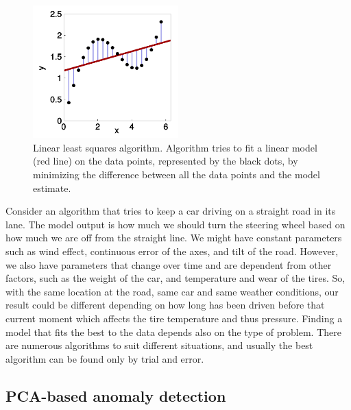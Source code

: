 \begin{figure}[htb]
    \centering
    \includegraphics[width=0.5\textwidth]{./appendices/linear-regression}
    \caption{Linear least squares algorithm.
    Algorithm tries to fit a linear model (red line) on the data points,
        represented by the black dots,
        by minimizing the difference between all the data points
        and the model estimate.~\cite{stulp2015many}
        \label{fig:linear-regression-example}}
\end{figure}

Consider an algorithm that tries to keep a car
driving on a straight road in its lane.
The model output is how much we should turn the steering wheel
based on how much we are off from the straight line.
We might have constant parameters such as
wind effect, continuous error of the axes, and tilt of the road.
However,
we also have parameters that change over time
and are dependent from other factors,
such as the weight of the car,
and temperature and wear of the tires.
So, with the same location at the road,
same car and same weather conditions,
our result could be different
depending on how long has been driven before that current moment
which affects the tire temperature and thus pressure.
Finding a model that fits the best to the data
depends also on the type of problem.
There are numerous algorithms to suit different situations,
and usually the best algorithm can be found
only by trial and error.



\subsection{PCA-based anomaly detection}\label{subsec:bg-pca-ada}

